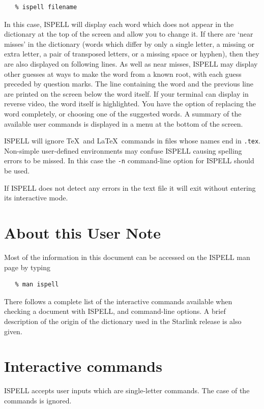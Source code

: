 \documentclass[twoside,11pt]{article}
\begin{document}
\begin{verbatim}
   % ispell filename
\end{verbatim}

In this case, ISPELL will display each word which does not appear in the
dictionary at the top of the screen and allow you to change it.
If there are `near misses' in the dictionary (words which differ by only a
single letter, a missing or extra letter, a pair of transposed letters, or a
missing space or hyphen), then they are also displayed on following lines.
As well as near misses, ISPELL may display other guesses at ways to make the
word from a known root, with each guess preceded by question marks.
The line containing the word and the previous line
are printed on the screen below the word itself. If your terminal can
display in reverse video, the word itself is highlighted.  You have the
option of replacing the word completely, or choosing one of the suggested
words.  A summary of the available user commands is displayed in a menu at the
bottom of the screen.

ISPELL will ignore \TeX\ and \LaTeX\ commands in files whose names end in
\verb+.tex+\@.  Non-simple user-defined environments may confuse ISPELL
causing spelling errors to be missed.
In this case the \verb+-n+ command-line option for ISPELL should be used.

If ISPELL does not detect any errors in the text file it will exit without
entering its interactive mode.


\section{About this User Note}

Most of the information in this document can be accessed on the ISPELL man page
by typing

\begin{verbatim}
   % man ispell
\end{verbatim}

There follows a complete list of the interactive commands available when
checking a document with ISPELL, and command-line options. A brief description
of the origin of the dictionary used in the Starlink release is also given.


\section{Interactive commands}

ISPELL accepts user inputs which are single-letter commands.  The
case of the commands is ignored.
\end{document}
